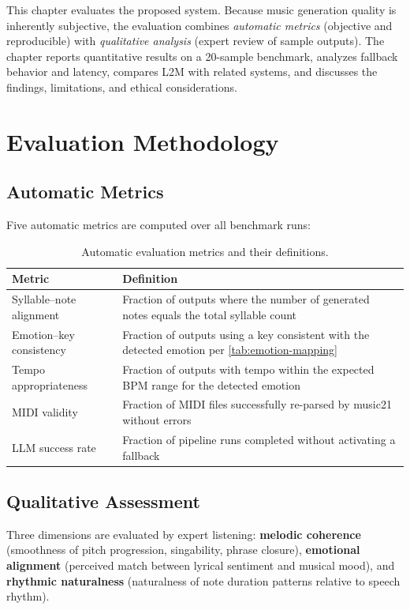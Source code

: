 This chapter evaluates the proposed system. Because music generation quality
is inherently subjective, the evaluation combines \emph{automatic metrics}
(objective and reproducible) with \emph{qualitative analysis} (expert review
of sample outputs). The chapter reports quantitative results on a 20-sample
benchmark, analyzes fallback behavior and latency, compares L2M with related
systems, and discusses the findings, limitations, and ethical
considerations.

\section{Evaluation Methodology}
\label{sec:ev-methodology}

\subsection{Automatic Metrics}

Five automatic metrics are computed over all benchmark runs:

\begin{table}[ht]
\centering
\caption[Automatic evaluation metrics]{Automatic evaluation metrics and
their definitions.}
\label{tab:metric-definitions}
\begin{tabular}{p{4.4cm} p{7.7cm}}
\toprule
\textbf{Metric} & \textbf{Definition} \\
\midrule
Syllable--note alignment & Fraction of outputs where the number of generated
notes equals the total syllable count \\
Emotion--key consistency & Fraction of outputs using a key consistent with
the detected emotion per \ref{tab:emotion-mapping} \\
Tempo appropriateness & Fraction of outputs with tempo within the expected
BPM range for the detected emotion \\
MIDI validity & Fraction of MIDI files successfully re-parsed by music21
without errors \\
LLM success rate & Fraction of pipeline runs completed without activating a
fallback \\
\bottomrule
\end{tabular}
\end{table}

\subsection{Qualitative Assessment}

Three dimensions are evaluated by expert listening: \textbf{melodic
coherence} (smoothness of pitch progression, singability, phrase closure),
\textbf{emotional alignment} (perceived match between lyrical sentiment and
musical mood), and \textbf{rhythmic naturalness} (naturalness of note
duration patterns relative to speech rhythm).

